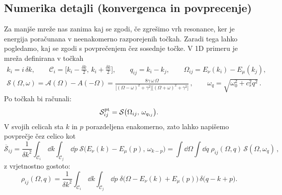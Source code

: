 \documentclass[a4paper,10pt]{article}
\begin{document}
\subsection{Numerika detajli (konvergenca in povprecenje)}
Za manjše mreže nas zanima kaj se zgodi, če zgrešimo vrh resonance, ker je energija poračunana v neenakomerno razporejenih točkah. Zaradi tega lahko pogledamo, kaj se zgodi s povprečenjem čez sosednje točke. V 1D primeru je mreža definirana v točkah
\begin{gather}
k_i = i\,{\delta k},\qquad \mathcal C_i=\big[k_i-\tfrac{{\delta k}}{2},\,k_i+\tfrac{{\delta k}}{2}\big],\qquad
q_{ij}=k_i-k_j,\qquad \Omega_{ij}=E_{\nu}(k_i)-E_{\mu}(k_j),\\
\mathcal{S}(\Omega, \omega)=\mathcal{A}(\Omega)-{A}(-\Omega)
=\frac{8\gamma\,\omega\,\Omega}{\big[(\Omega-\omega)^2+\gamma^2\big]\big[(\Omega+\omega)^2+\gamma^2\big]}\,,
\qquad \omega_q=\sqrt{\omega_0^2+c_s^2q^2}\,.
\end{gather}
Po točkah bi računali:
\begin{equation}
\mathcal{S}^{\rm pt}_{ij}=\mathcal{S}\big(\Omega_{ij},\,\omega_{q_{ij}}\big).
\end{equation}
V svojih celicah sta $k$ in $p$ porazdeljena enakomerno, zato lahko napišemo povprečje čez celico kot
\begin{equation}
\overline{\mathcal{S}}_{ij}=\frac{1}{{\delta k}^{2}}\int_{\mathcal C_i}\,\dd{k}\int_{\mathcal C_j}\,\dd{p}\;
\mathcal{S}\big(E_\nu(k)-E_\mu(p),\,\omega_{k-p}\big)
=\int\! \dd{\Omega}\!\int\! \dd{q}\;\rho_{ij}(\Omega, q)\,\mathcal{S}(\Omega, \omega_q)\,,
\end{equation}
z vrjetnostno gostoto:
\begin{equation}
\rho_{ij}(\Omega, q)=\frac{1}{{\delta k}^{2}}\int_{\mathcal C_i}\!\,\dd{k}\int_{\mathcal C_j}\,\dd{p}\;
\delta\big(\Omega-E_\nu(k)+E_\mu(p)\big)\,\delta\big(q-k+p\big).
\end{equation}
 
\end{document}
